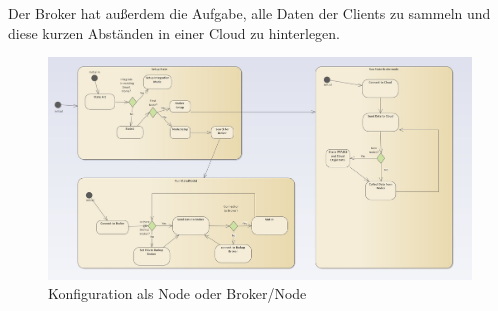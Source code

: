 \documentclass[conference]{IEEEtran}
\begin{document}
Der Broker hat außerdem die Aufgabe, alle Daten der Clients zu sammeln und diese kurzen Abständen in einer Cloud zu hinterlegen. 
\begin{figure}[h]
    \centering
    \includegraphics[width=2\linewidth]{state_machine.jpg}
    \caption{Konfiguration als Node oder Broker/Node}
    \label{fig:statemachine}
\end{figure}
\begin{thebibliography}{00}
\end{thebibliography}
\end{document}
